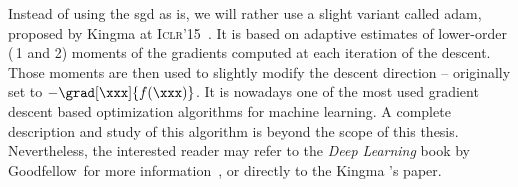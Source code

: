 Instead of using the \gls{sgd} as is, we will rather use a slight variant called \gls{adam}, proposed by Kingma \etal{} at \textsc{Iclr}'15~\cite{kingma_adam_2014}.
It is based on adaptive estimates of lower-order (\ie{}\,1 and 2) moments of the gradients computed at each iteration of the descent.
Those moments are then used to slightly modify the descent direction -- originally set to \(- \grad[\xxx]{f(\xxx)}\).
It is nowadays one of the most used gradient descent based optimization algorithms for machine learning.
A complete description and study of this algorithm is beyond the scope of this thesis.
Nevertheless, the interested reader may refer to the \emph{Deep Learning} book by Goodfellow \etal{}\,for more information~\cite[Sec.~8.5.3]{goodfellow_deep_2017}, or directly to the Kingma \etal{}'s paper.